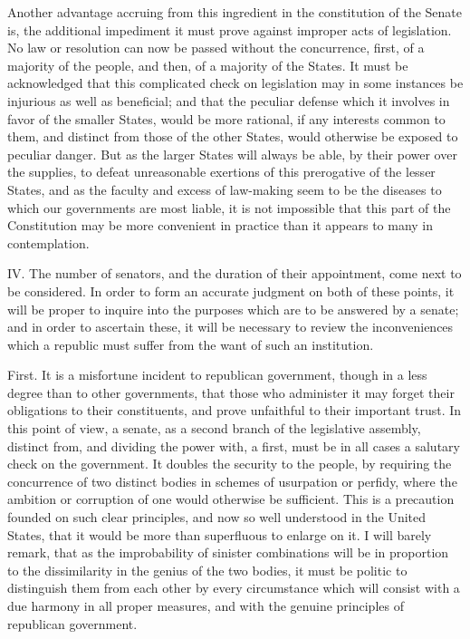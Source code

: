 Another advantage accruing from this ingredient in the constitution of the Senate is, the additional impediment it must prove against improper acts of legislation. No law or resolution can now be passed without the concurrence, first, of a majority of the people, and then, of a majority of the States. It must be acknowledged that this complicated check on legislation may in some instances be injurious as well as beneficial; and that the peculiar defense which it involves in favor of the smaller States, would be more rational, if any interests common to them, and distinct from those of the other States, would otherwise be exposed to peculiar danger. But as the larger States will always be able, by their power over the supplies, to defeat unreasonable exertions of this prerogative of the lesser States, and as the faculty and excess of law-making seem to be the diseases to which our governments are most liable, it is not impossible that this part of the Constitution may be more convenient in practice than it appears to many in contemplation.

IV. The number of senators, and the duration of their appointment, come next to be considered. In order to form an accurate judgment on both of these points, it will be proper to inquire into the purposes which are to be answered by a senate; and in order to ascertain these, it will be necessary to review the inconveniences which a republic must suffer from the want of such an institution.

First. It is a misfortune incident to republican government, though in a less degree than to other governments, that those who administer it may forget their obligations to their constituents, and prove unfaithful to their important trust. In this point of view, a senate, as a second branch of the legislative assembly, distinct from, and dividing the power with, a first, must be in all cases a salutary check on the government. It doubles the security to the people, by requiring the concurrence of two distinct bodies in schemes of usurpation or perfidy, where the ambition or corruption of one would otherwise be sufficient. This is a precaution founded on such clear principles, and now so well understood in the United States, that it would be more than superfluous to enlarge on it. I will barely remark, that as the improbability of sinister combinations will be in proportion to the dissimilarity in the genius of the two bodies, it must be politic to distinguish them from each other by every circumstance which will consist with a due harmony in all proper measures, and with the genuine principles of republican government.

